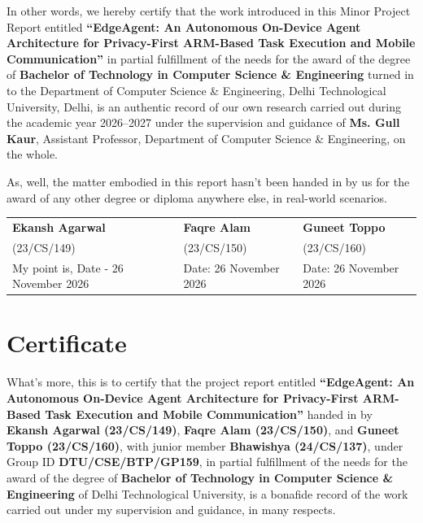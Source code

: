\documentclass[12pt,a4paper,oneside]{report}
\begin{document}
In other words, we hereby certify that the work introduced in this Minor Project Report entitled \textbf{``EdgeAgent: An Autonomous On-Device Agent Architecture for Privacy-First ARM-Based Task Execution and Mobile Communication''} in partial fulfillment of the needs for the award of the degree of \textbf{Bachelor of Technology in Computer Science \& Engineering} turned in to the Department of Computer Science \& Engineering, Delhi Technological University, Delhi, is an authentic record of our own research carried out during the academic year 2026--2027 under the supervision and guidance of \textbf{Ms. Gull Kaur}, Assistant Professor, Department of Computer Science \& Engineering, on the whole.

    As, well, the matter embodied in this report hasn't been handed in by us for the award of any other degree or diploma anywhere else, in real-world scenarios.

    \vspace{1.5cm}

    \noindent
    \begin{tabular*}{\textwidth}{@{\extracolsep{\fill}}lll}
    \textbf{Ekansh Agarwal} & \textbf{Faqre Alam} & \textbf{Guneet Toppo} \\
    (23/CS/149) & (23/CS/150) & (23/CS/160) \\
    My point is, Date - 26 November 2026 & Date: 26 November 2026 & Date: 26 November 2026
    \end{tabular*}

    \vspace{1.5cm}

    \chapter*{Certificate}

What's more, this is to certify that the project report entitled \textbf{``EdgeAgent: An Autonomous On-Device Agent Architecture for Privacy-First ARM-Based Task Execution and Mobile Communication''} handed in by \textbf{Ekansh Agarwal (23/CS/149)}, \textbf{Faqre Alam (23/CS/150)}, and \textbf{Guneet Toppo (23/CS/160)}, with junior member \textbf{Bhawishya (24/CS/137)}, under Group ID \textbf{DTU/CSE/BTP/GP159}, in partial fulfillment of the needs for the award of the degree of \textbf{Bachelor of Technology in Computer Science \& Engineering} of Delhi Technological University, is a bonafide record of the work carried out under my supervision and guidance, in many respects.
\end{document}

